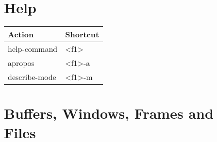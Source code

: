 \documentclass[english]{rcalibrionecolumn}
\title{\color{statblue}{Emacs Shortcuts}}
\author{\color{statblue}Ronert Obst}
\date{\color{statblue}\today}
\begin{document}
\maketitle

\setcounter{tocdepth}{3}
\tableofcontents
\vspace*{1cm}
\section{Help}
\label{sec-1}


\begin{center}
\begin{tabular}{ll}
 \textbf{Action}  &  \textbf{Shortcut}  \\
\hline
 help-command     &  <f1>               \\
 apropos          &  <f1>-a             \\
 describe-mode    &  <f1>-m             \\
\end{tabular}
\end{center}
\section{Buffers, Windows, Frames and Files}
\label{sec-2}
\end{document}
